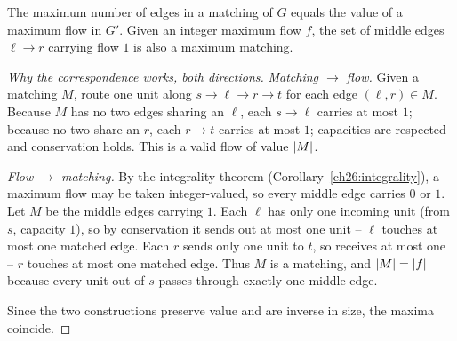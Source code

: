 \begin{center}
\end{center}

\begin{theorem}
\label{ch26:matching-thm}
The maximum number of edges in a matching of $G$ equals the value of a maximum
flow in $G'$. Given an integer maximum flow $f$, the set of middle
edges $\ell \to r$ carrying flow $1$ is also a maximum matching.
\end{theorem}

\begin{proof}[Why the correspondence works, both directions]
\emph{Matching $\to$ flow.} Given a matching $M$, route one unit along
$s \to \ell \to r \to t$ for each edge $(\ell,r)\in M$. Because $M$ has no two
edges sharing an $\ell$, each $s\to\ell$ carries at most $1$; because no two
share an $r$, each $r\to t$ carries at most $1$; capacities are respected and
conservation holds. This is a valid flow of value $\lvert M\rvert$.

\emph{Flow $\to$ matching.} By the integrality theorem
(Corollary~\ref{ch26:integrality}), a maximum flow may be taken integer-valued,
so every middle edge carries $0$ or $1$. Let $M$ be the middle edges carrying
$1$. Each $\ell$ has only one incoming unit (from $s$, capacity $1$), so by
conservation it sends out at most one unit -- $\ell$ touches at most one matched
edge. Each $r$ sends only one unit to $t$, so receives at most one -- $r$
touches at most one matched edge. Thus $M$ is a matching, and $\lvert M\rvert =
\lvert f\rvert$ because every unit out of $s$ passes through exactly one middle edge.

Since the two constructions preserve value and are inverse in size, the maxima
coincide.
\end{proof}

